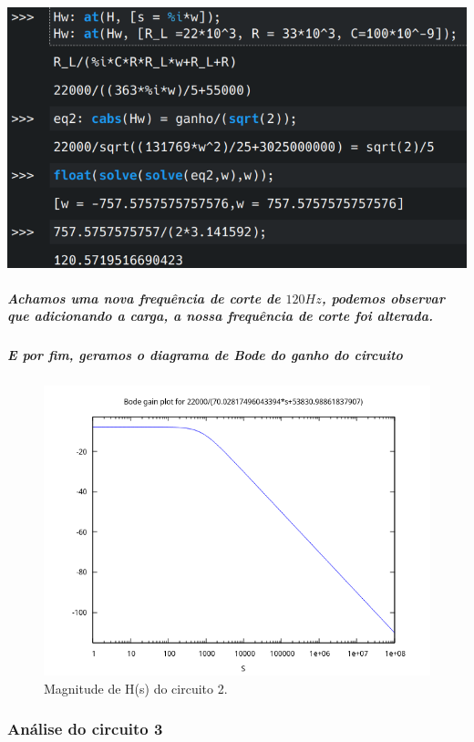 \documentclass[12pt,twoside, a4paper, twocolumn]{article}
\begin{document}
\begin{adjustbox}{scale=0.4}
    \includegraphics{freqcorte2.png}
\end{adjustbox}


\subparagraph*{Achamos uma nova frequência de corte de $120Hz$, podemos observar que adicionando a carga, a nossa frequência de corte foi alterada.}


\subparagraph*{E por fim, geramos o diagrama de Bode do ganho do circuito}


\begin{figure}[h]
    \centering
    \includegraphics[width=1\columnwidth]{images/bodegain2.png}
    \caption{Magnitude de H(s) do circuito 2.}
\end{figure}


\subsubsection{Análise do circuito 3}
\end{document}
